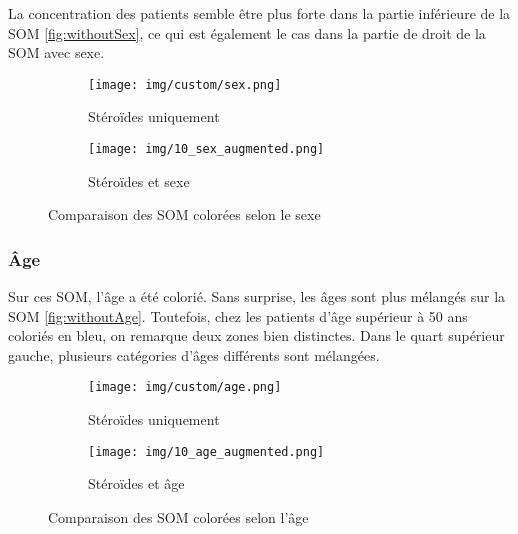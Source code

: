     La concentration des patients semble être plus forte dans la partie inférieure de la SOM \autoref{fig:withoutSex}, ce qui est également le cas dans la partie de droit de la SOM avec sexe.

    \begin{figure}[H]
        \begin{subfigure}[b]{.5\textwidth}
            \centering
            \texttt{[image: img/custom/sex.png]}    
            \caption{Stéroïdes uniquement}
            \label{fig:withoutSex}
        \end{subfigure}
        \begin{subfigure}[b]{.5\textwidth}
            \centering
            \texttt{[image: img/10\_sex\_augmented.png]}
            \caption{Stéroïdes et sexe}
            \label{fig:withSex}
        \end{subfigure}
        \caption{Comparaison des SOM colorées selon le sexe}
        \label{fig:sexComp}
    \end{figure}

\subsubsection*{Âge}

    Sur ces SOM, l'âge a été colorié. Sans surprise, les âges sont plus mélangés sur la SOM \autoref{fig:withoutAge}. Toutefois, chez les patients d'âge supérieur à 50 ans coloriés en bleu, on remarque deux zones bien distinctes. Dans le quart supérieur gauche, plusieurs catégories d'âges différents sont mélangées.


    \begin{figure}[H]
        \begin{subfigure}[b]{.5\textwidth}
            \centering
            \texttt{[image: img/custom/age.png]}    
            \caption{Stéroïdes uniquement}
            \label{fig:withoutAge}
        \end{subfigure}
        \begin{subfigure}[b]{.5\textwidth}
            \centering
            \texttt{[image: img/10\_age\_augmented.png]} 
            \caption{Stéroïdes et âge}
            \label{fig:withAge}
        \end{subfigure}
        \caption{Comparaison des SOM colorées selon l'âge}
        \label{fig:ageComp}
    \end{figure}

